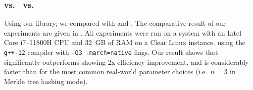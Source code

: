 \subsubsection*{\Arion{} vs.\  \Griffin{} vs.\  \Poseidon{}}
\begin{table}
  \centering
  \caption{Performance of various hash functions for generating a proof of membership in a Merkle 
      tree accumulator over BN254. Proving times are in milliseconds.}\label{tab:runtimes}
\end{table}

Using our library, we compared \Arion{} with \Griffin{} and \Poseidon{}.
The comparative result of our experiments are given in . 
All experiments were run on a system with an Intel Core i7--11800H CPU and 32~GB of RAM on a Clear 
Linux instance, using the \texttt{g++-12} compiler with \texttt{-O3 -march=native} flags.
Our result shows that \Arionhash{} significantly outperforms \Poseidon{} showing \(2\)x efficiency 
improvement, and \Aarionhash{} is considerably faster than \Griffin{} for the most common
real-world parameter choices (i.e.\  \(n = 3\) in Merkle tree hashing mode).
